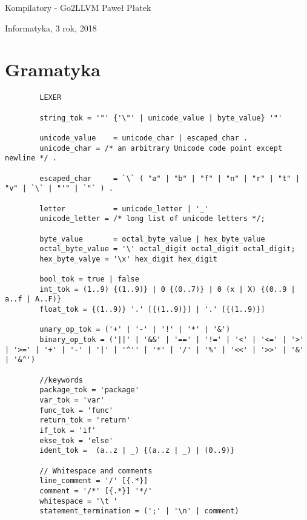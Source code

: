 \documentclass[a4paper,16pt]{article}
\begin{document}
	{\Large Kompilatory - Go2LLVM \hfill \hfill Paweł Płatek
		
		Informatyka, 3 rok, 2018}
	

	\section{Gramatyka}
	
	\begin{verbatim}
		LEXER
		
		string_tok = '"' {'\"' | unicode_value | byte_value} '"'
		
		unicode_value    = unicode_char | escaped_char .
		unicode_char = /* an arbitrary Unicode code point except newline */ .
		
		escaped_char     = `\` ( "a" | "b" | "f" | "n" | "r" | "t" | "v" | `\` | "'" | `"` ) .
		
		letter           = unicode_letter | '_'
		unicode_letter = /* long list of unicode letters */;
		
		byte_value       = octal_byte_value | hex_byte_value
		octal_byte_value = '\' octal_digit octal_digit octal_digit;
		hex_byte_valye = '\x' hex_digit hex_digit
		
		bool_tok = true | false
		int_tok = (1..9) {(1..9)} | 0 {(0..7)} | 0 (x | X) {(0..9 | a..f | A..F)}
		float_tok = {(1..9)} '.' [{(1..9)}] | '.' [{(1..9)}]
		
		unary_op_tok = ('+' | '-' | '!' | '*' | '&')
		binary_op_tok = ('||' | '&&' | '==' | '!=' | '<' | '<=' | '>' | '>=' | '+' | '-' | '|' | '^'' | '*' | '/' | '%' | '<<' | '>>' | '&' | '&^')
		
		//keywords
		package_tok = 'package'
		var_tok = 'var'
		func_tok = 'func'
		return_tok = 'return'
		if_tok = 'if'
		ekse_tok = 'else'
		ident_tok =  (a..z | _) {(a..z | _) | (0..9)}
				
		// Whitespace and comments
		line_comment = '/' [{.*}]
		comment = '/*' [{.*}] '*/'
		whitespace = '\t '
		statement_termination = (';' | '\n' | comment)	
	
	\end{verbatim}
	
\end{document}
